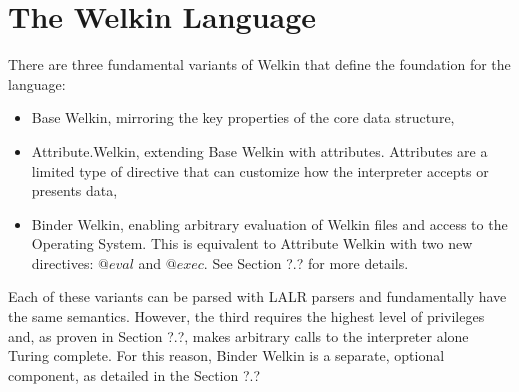 \section{The Welkin Language}

There are three fundamental variants of Welkin that define the foundation for the language:
\begin{itemize}
	\item Base Welkin, mirroring the key properties of the core data structure,
	\item Attribute.Welkin, extending Base Welkin with attributes. Attributes are a limited type of directive that can customize how the interpreter accepts or presents data,
	\item Binder Welkin, enabling arbitrary evaluation of Welkin files and access to the Operating System. This is equivalent to Attribute Welkin with two new directives: $@eval$ and $@exec.$ See Section ?.? for more details.
\end{itemize}
Each of these variants can be parsed with LALR parsers and fundamentally have the same semantics. However, the third requires the highest level of privileges and, as proven in Section ?.?, makes arbitrary calls to the interpreter alone Turing complete. For this reason, Binder Welkin is a separate, optional component, as detailed in the Section ?.?
